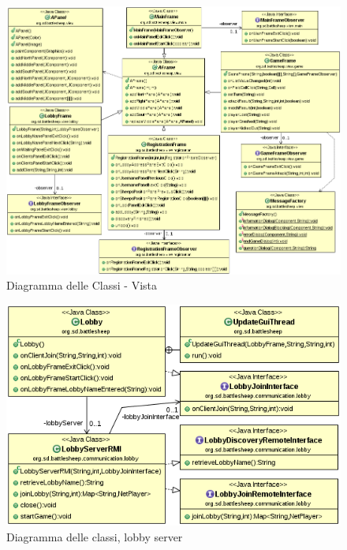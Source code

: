 \documentclass[a4paper,10pt]{scrartcl}
\begin{document}
\begin{figure}[!h]
	\centering
	\includegraphics[scale=0.4]{core/imgs/UML/VistaBellaUML-noattr.png}
	\caption{Diagramma delle Classi - Vista}
	\label{figure:class_diagram_view}
\end{figure}

\begin{figure}[!ht]
    \centering
\includegraphics[width=1.0\textwidth]{core/imgs/UML/LobbyCommunicationUML-noattr.png}
    \caption{Diagramma delle classi, lobby server}
    \label{fig:classlobby}
\end{figure}
\end{document}
